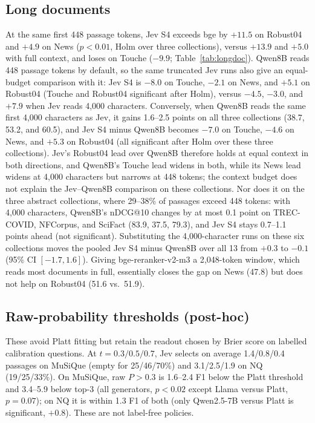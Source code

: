 \subsection{Long documents}

At the same first 448 passage tokens, Jev S4 exceeds bge by $+11.5$ on Robust04 and $+4.9$ on News ($p<0.01$, Holm over three collections), versus $+13.9$ and $+5.0$ with full context, and loses on Touche ($-9.9$; Table~\ref{tab:longdoc}). Qwen8B reads 448 passage tokens by default, so the same truncated Jev runs also give an equal-budget comparison with it: Jev S4 is $-8.0$ on Touche, $-2.1$ on News, and $+5.1$ on Robust04 (Touche and Robust04 significant after Holm), versus $-4.5$, $-3.0$, and $+7.9$ when Jev reads 4{,}000 characters. Conversely, when Qwen8B reads the same first 4{,}000 characters as Jev, it gains 1.6--2.5 points on all three collections (38.7, 53.2, and 60.5), and Jev S4 minus Qwen8B becomes $-7.0$ on Touche, $-4.6$ on News, and $+5.3$ on Robust04 (all significant after Holm over these three collections). Jev's Robust04 lead over Qwen8B therefore holds at equal context in both directions, and Qwen8B's Touche lead widens in both, while its News lead widens at 4{,}000 characters but narrows at 448 tokens; the context budget does not explain the Jev--Qwen8B comparison on these collections. Nor does it on the three abstract collections, where 29--38\% of passages exceed 448 tokens: with 4{,}000 characters, Qwen8B's nDCG@10 changes by at most 0.1 point on TREC-COVID, NFCorpus, and SciFact (83.9, 37.5, 79.3), and Jev S4 stays 0.7--1.1 points ahead (not significant). Substituting the 4{,}000-character runs on these six collections moves the pooled Jev S4 minus Qwen8B over all 13 from $+0.3$ to $-0.1$ (95\% CI $[-1.7,1.6]$).
Giving bge-reranker-v2-m3 a 2{,}048-token window, which reads most documents in full, essentially closes the gap on News (47.8) but does not help on Robust04 (51.6 vs.\ 51.9).

\subsection{Raw-probability thresholds (post-hoc)}
These avoid Platt fitting but retain the readout chosen by Brier score on labelled calibration questions. At $t=0.3/0.5/0.7$, Jev selects on average 1.4/0.8/0.4 passages on MuSiQue (empty for 25/46/70\%) and 3.1/2.5/1.9 on NQ (19/25/33\%). On MuSiQue, raw $P>0.3$ is 1.6--2.4 F1 below the Platt threshold and 3.4--5.9 below top-3 (all generators, $p<0.02$ except Llama versus Platt, $p=0.07$); on NQ it is within 1.3 F1 of both (only Qwen2.5-7B versus Platt is significant, $+0.8$). These are not label-free policies.

